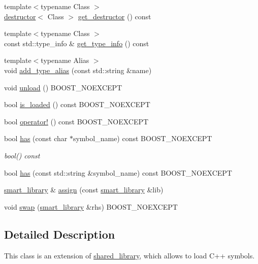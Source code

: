 \begin{DoxyCompactItemize}
\item 
{\footnotesize template$<$typename Class $>$ }\\\hyperlink{a01360}{destructor}$<$ Class $>$ \hyperlink{a01712_aeab1cc5094ad003c67c9e4b418660d3a}{get\+\_\+destructor} () const
\item 
{\footnotesize template$<$typename Class $>$ }\\const std\+::type\+\_\+info \& \hyperlink{a01712_a8f711a4eb7118129a2826d61abbbf5a3}{get\+\_\+type\+\_\+info} () const
\item 
{\footnotesize template$<$typename Alias $>$ }\\void \hyperlink{a01712_aa19292156eb6497e10f108fb614d9939}{add\+\_\+type\+\_\+alias} (const std\+::string \&name)
\item 
void \hyperlink{a01712_a2b96d7817794a2adabe1f7bb22be5483}{unload} () B\+O\+O\+S\+T\+\_\+\+N\+O\+E\+X\+C\+E\+PT
\item 
bool \hyperlink{a01712_abe903598b2f65c04360d58943cc08255}{is\+\_\+loaded} () const B\+O\+O\+S\+T\+\_\+\+N\+O\+E\+X\+C\+E\+PT
\item 
bool \hyperlink{a01712_a57ba8c8f9d05415bb4698fa05bdd9153}{operator!} () const B\+O\+O\+S\+T\+\_\+\+N\+O\+E\+X\+C\+E\+PT
\item 
bool \hyperlink{a01712_a14d92d1f096a99ee1f59a6e6ac9c635c}{has} (const char $\ast$symbol\+\_\+name) const B\+O\+O\+S\+T\+\_\+\+N\+O\+E\+X\+C\+E\+PT
\begin{DoxyCompactList}\small\item\em bool() const \end{DoxyCompactList}\item 
bool \hyperlink{a01712_a9263542eeb995ab16f85901d90d1f868}{has} (const std\+::string \&symbol\+\_\+name) const B\+O\+O\+S\+T\+\_\+\+N\+O\+E\+X\+C\+E\+PT
\item 
\hyperlink{a01712}{smart\+\_\+library} \& \hyperlink{a01712_a0e0a4b60a6f388ad6d97bddee1b2b9d6}{assign} (const \hyperlink{a01712}{smart\+\_\+library} \&lib)
\item 
void \hyperlink{a01712_a437a1b5c2f71728147fcda529b553051}{swap} (\hyperlink{a01712}{smart\+\_\+library} \&rhs) B\+O\+O\+S\+T\+\_\+\+N\+O\+E\+X\+C\+E\+PT
\end{DoxyCompactItemize}


\subsection{Detailed Description}
This class is an extension of \hyperlink{a01708}{shared\+\_\+library}, which allows to load C++ symbols. 

